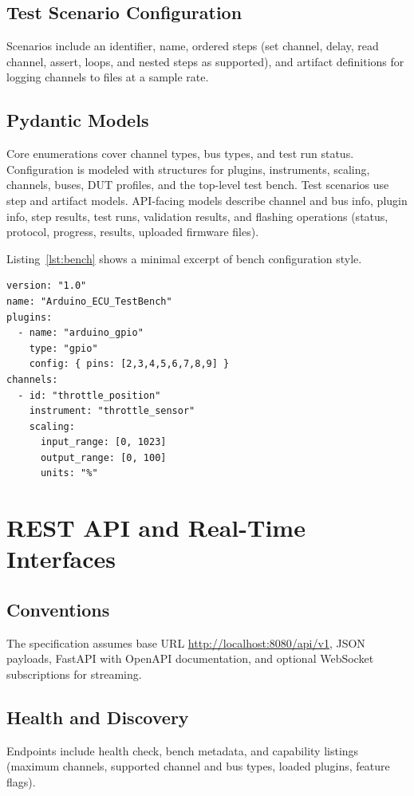 \documentclass[conference]{IEEEtran}
\begin{document}
\subsection{Test Scenario Configuration}
Scenarios include an identifier, name, ordered steps (set channel, delay, read channel, assert, loops, and nested steps as supported), and artifact definitions for logging channels to files at a sample rate.

\subsection{Pydantic Models}
Core enumerations cover channel types, bus types, and test run status. Configuration is modeled with structures for plugins, instruments, scaling, channels, buses, DUT profiles, and the top-level test bench. Test scenarios use step and artifact models. API-facing models describe channel and bus info, plugin info, step results, test runs, validation results, and flashing operations (status, protocol, progress, results, uploaded firmware files).

Listing~\ref{lst:bench} shows a minimal excerpt of bench configuration style.

\begin{lstlisting}[language={},caption={Excerpt of test bench YAML structure.},label={lst:bench}]
version: "1.0"
name: "Arduino_ECU_TestBench"
plugins:
  - name: "arduino_gpio"
    type: "gpio"
    config: { pins: [2,3,4,5,6,7,8,9] }
channels:
  - id: "throttle_position"
    instrument: "throttle_sensor"
    scaling:
      input_range: [0, 1023]
      output_range: [0, 100]
      units: "%"
\end{lstlisting}

\section{REST API and Real-Time Interfaces}

\subsection{Conventions}
The specification assumes base URL \url{http://localhost:8080/api/v1}, JSON payloads, FastAPI with OpenAPI documentation, and optional WebSocket subscriptions for streaming.

\subsection{Health and Discovery}
Endpoints include health check, bench metadata, and capability listings (maximum channels, supported channel and bus types, loaded plugins, feature flags).
\end{document}
